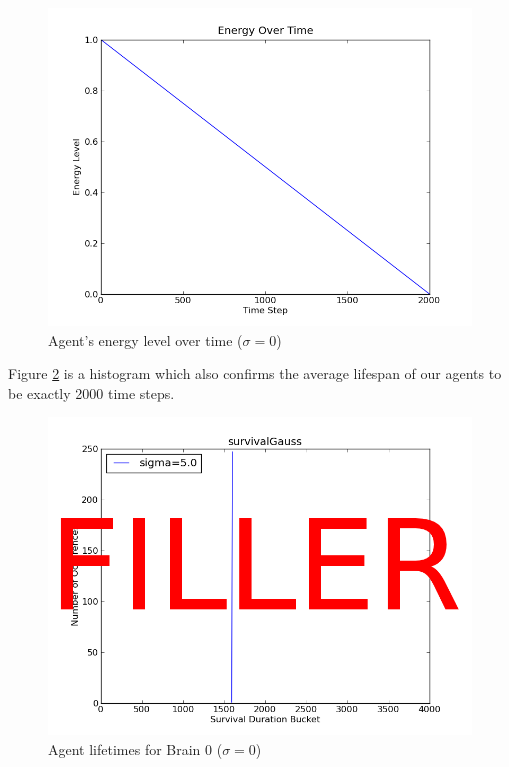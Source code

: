 \begin{figure}
\begin{center}
  \includegraphics[scale=.65]{plots/brain0energy.png}
  \caption{Agent's energy level over time ($\sigma = 0$)}
  \label{fig:brain0energy}
\end{center}
\end{figure}

Figure \ref{fig:brain0his} is a histogram which also confirms the average 
lifespan of our agents to be exactly 2000 time steps.

\begin{figure}
\begin{center}
  \includegraphics[scale=.65]{plots/filler.png}
  \caption{Agent lifetimes for Brain 0 ($\sigma = 0$)}
  \label{fig:brain0his}
\end{center}
\end{figure}


